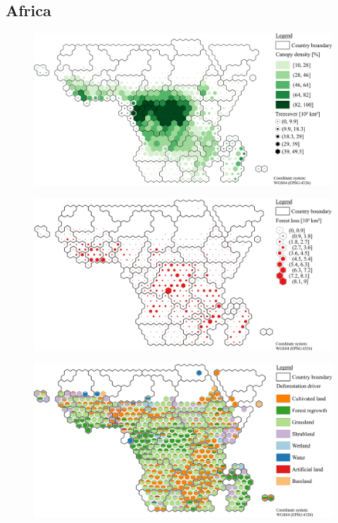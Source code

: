 		\subsection{Africa}
			\begin{figure}[ht]
				\centering
				\includegraphics[scale=1]{img/africa_treecover_frameless}
				\caption[Ecosystem service values]{}
				\label{fig:africacover}
			\end{figure}
			\begin{figure}[ht]
				\centering
				\includegraphics[scale=1]{img/africa_loss_frameless}
				\caption[Ecosystem service values]{}
				\label{fig:africaloss}
			\end{figure}
			\begin{figure}[ht]
				\centering
				\includegraphics[scale=1]{img/africa_driver_frameless}
				\caption[Ecosystem service values]{}
				\label{fig:africadriver}
			\end{figure}

